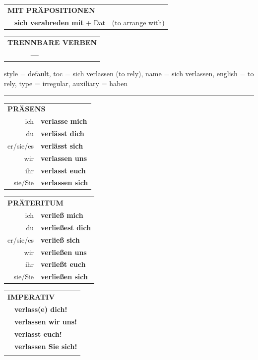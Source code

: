 \begin{verbentry}
\vspace{10pt}

\begin{tabular}{lll}
\multicolumn{3}{l}{\textbf{MIT PRÄPOSITIONEN}}\\
& \textbf{sich verabreden mit} + Dat & (to arrange with)\\
\end{tabular}
\hfill
\begin{tabular}{lll}
\multicolumn{3}{l}{\textbf{TRENNBARE VERBEN}}\\
& \textbf{---} & \\
\end{tabular}
\vspace{-5pt}
\end{verbentry}

\begin{verbentry}{
  style = {default},
  toc = {sich verlassen (to rely)},
  name = {sich verlassen},
  english = {to rely},
  type = {irregular},
  auxiliary = {haben}
}
 
    
     \vspace{5pt}

    \hrule
    
    \vspace{5pt}

  \begin{tabular}{rl}
     \multicolumn{2}{l}{\textbf{PRÄSENS} }\\
    ich & \textbf{verlasse mich}\\
    du & \textbf{verlässt dich}\\
    er/sie/es & \textbf{verlässt sich}\\
    wir & \textbf{verlassen uns}\\
    ihr & \textbf{verlasst euch}\\
    sie/Sie & \textbf{verlassen sich}\\
  \end{tabular}
  \hfill
     \begin{tabular}{rl}
    \multicolumn{2}{l}{\textbf{PRÄTERITUM} }\\
    ich & \textbf{verließ mich}\\
    du & \textbf{verließest dich}\\
    er/sie/es & \textbf{verließ sich}\\
    wir & \textbf{verließen uns}\\
    ihr & \textbf{verließt euch}\\
    sie/Sie & \textbf{verließen sich}\\
  \end{tabular}
  \hfill
  \begin{tabular}{rl}
     \multicolumn{2}{l}{\textbf{IMPERATIV} }\\
   & \textbf{verlass(e) dich!}\\
   & \textbf{verlassen wir uns!}\\
   & \textbf{verlasst euch!}\\
   & \textbf{verlassen Sie sich!}\\
   & \vspace{10pt}
  \end{tabular}


\end{verbentry}
